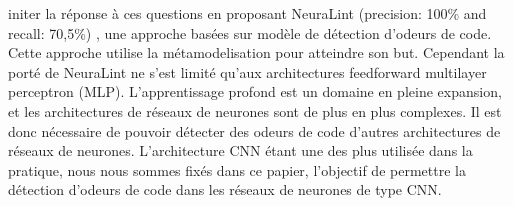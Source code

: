 initer la réponse à ces questions en proposant NeuraLint (precision: 100\% and
recall: 70,5\%) \cite{nikanjam2021automatic}, une approche basées sur modèle
de détection d'odeurs de code. Cette approche utilise la métamodelisation pour atteindre son
but. Cependant la porté de NeuraLint ne s'est limité qu'aux architectures
feedforward multilayer perceptron (MLP). L'apprentissage profond est un domaine
en pleine expansion, et les architectures de réseaux de neurones sont de plus en
plus complexes. Il est donc nécessaire de pouvoir détecter des odeurs de code
d'autres architectures de réseaux de neurones. L'architecture CNN étant une des
plus utilisée dans la pratique, nous nous sommes fixés dans ce papier, l'objectif de
permettre la détection d'odeurs de code dans les réseaux de neurones de type
CNN.










